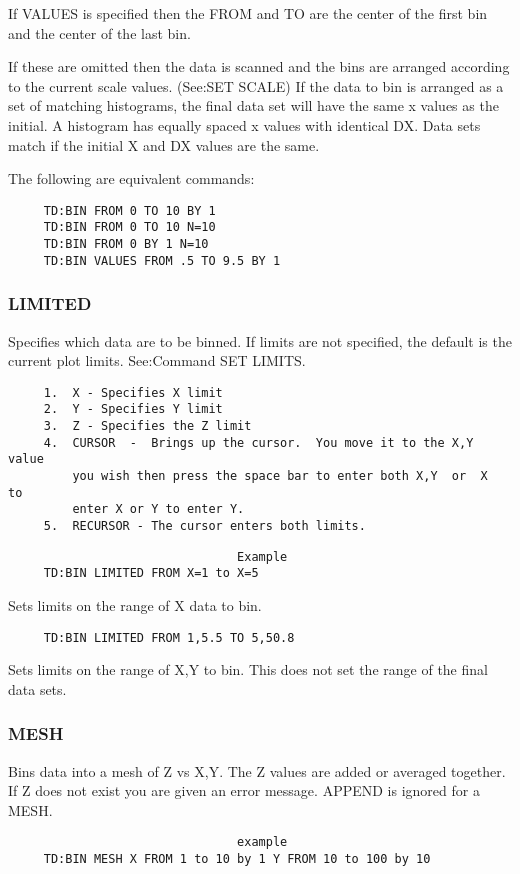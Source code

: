 If VALUES is specified then the FROM and TO are the center of the first
bin and the center of the last bin.  

If these are omitted then the data is scanned and the bins are arranged
according to the current scale values.  (See:SET SCALE) If the data  to
bin  is  arranged  as  a set of matching histograms, the final data set
will have the same x values as the initial.  A  histogram  has  equally
spaced  x  values  with identical DX.  Data sets match if the initial X
and DX values are the same.  

The following are equivalent commands:  
\begin{verbatim}
     TD:BIN FROM 0 TO 10 BY 1 
     TD:BIN FROM 0 TO 10 N=10 
     TD:BIN FROM 0 BY 1 N=10 
     TD:BIN VALUES FROM .5 TO 9.5 BY 1 
\end{verbatim}
\subsubsection{LIMITED}
Specifies  which  data  are to be binned.  If limits are not specified,
the default is the current plot limits.  See:Command SET LIMITS.  
\begin{verbatim}
     1.  X - Specifies X limit 
     2.  Y - Specifies Y limit 
     3.  Z - Specifies the Z limit 
     4.  CURSOR  -  Brings up the cursor.  You move it to the X,Y value
         you wish then press the space bar to enter both X,Y  or  X  to
         enter X or Y to enter Y.  
     5.  RECURSOR - The cursor enters both limits.  
\end{verbatim}

\begin{verbatim}
                                Example
     TD:BIN LIMITED FROM X=1 to X=5 
\end{verbatim}
Sets limits on the range of X data to bin.  
\begin{verbatim}
     TD:BIN LIMITED FROM 1,5.5 TO 5,50.8 
\end{verbatim}
Sets limits on the range of X,Y to bin.  This does not set the range of
the final data sets.  
\subsubsection{MESH}
Bins  data into a mesh of Z vs X,Y.  The Z values are added or averaged
together.  If Z does not exist you are given an error message.   APPEND
is ignored for a MESH.  
\begin{verbatim}
                                example
     TD:BIN MESH X FROM 1 to 10 by 1 Y FROM 10 to 100 by 10 
\end{verbatim}
